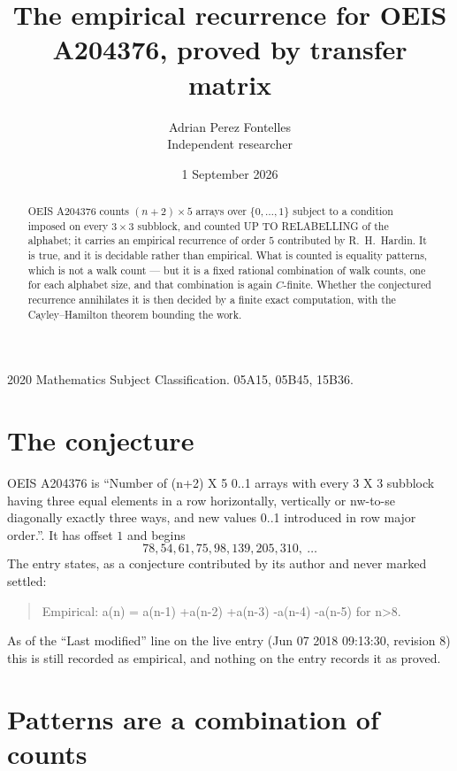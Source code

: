 \documentclass[11pt,a4paper]{article}
\title{The empirical recurrence for OEIS A204376, proved by transfer matrix}
\author{Adrian Perez Fontelles\\ \small Independent researcher}
\date{1 September 2026}
\theoremstyle{plain}
\theoremstyle{definition}
\begin{document}
\maketitle

\begin{abstract}
OEIS A204376 counts $(n+2)\times5$ arrays over $\{0,\dots,1\}$ subject to a condition imposed on
every $3\times3$ subblock, and counted UP TO RELABELLING of the
alphabet; it carries an empirical recurrence of order $5$ contributed by
R.~H.~Hardin. It is true, and it is decidable rather than empirical. What is counted is
equality patterns, which is not a walk count --- but it is a fixed rational combination of
walk counts, one for each alphabet size, and that combination is again $C$-finite. Whether the
conjectured recurrence annihilates it is then decided by a finite exact computation, with the
Cayley--Hamilton theorem bounding the work.
\end{abstract}

\noindent\small 2020 Mathematics Subject Classification. 05A15, 05B45, 15B36.\normalsize

\section{The conjecture}

OEIS A204376 is ``Number of (n+2) X 5 0..1 arrays with every 3 X 3 subblock having three equal elements in a row horizontally, vertically or nw-to-se diagonally exactly three ways, and new values 0..1 introduced in row major order.''. It has offset $1$ and begins
\[
78, 54, 61, 75, 98, 139, 205, 310,\ \dots
\]
The entry states, as a conjecture contributed by its author and never marked settled:
\begin{quote}
Empirical: a(n) = a(n-1) +a(n-2) +a(n-3) -a(n-4) -a(n-5) for n>8.
\end{quote}
As of the ``Last modified'' line on the live entry (Jun 07 2018 09:13:30, revision 8) this is still
recorded as empirical, and nothing on the entry records it as proved.

\section{Patterns are a combination of counts}
\end{document}

